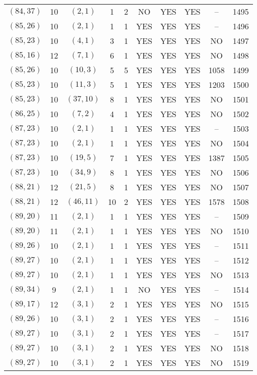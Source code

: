 \begin{longtable}{|c|c|c|c|c|c|c|c|c|c|}
$(84, 37)$ & 10 & $(2, 1)$ & 1 & 2 & NO & YES & YES & -- & 1495\\
$(85, 26)$ & 10 & $(2, 1)$ & 1 & 1 & YES & YES & YES & -- & 1496\\
$(85, 23)$ & 10 & $(4, 1)$ & 3 & 1 & YES & YES & YES & NO & 1497\\
$(85, 16)$ & 12 & $(7, 1)$ & 6 & 1 & YES & YES & YES & NO & 1498\\
$(85, 26)$ & 10 & $(10, 3)$ & 5 & 5 & YES & YES & YES & 1058 & 1499\\
$(85, 23)$ & 10 & $(11, 3)$ & 5 & 1 & YES & YES & YES & 1203 & 1500\\
$(85, 23)$ & 10 & $(37, 10)$ & 8 & 1 & YES & YES & YES & NO & 1501\\
$(86, 25)$ & 10 & $(7, 2)$ & 4 & 1 & YES & YES & YES & NO & 1502\\
$(87, 23)$ & 10 & $(2, 1)$ & 1 & 1 & YES & YES & YES & -- & 1503\\
$(87, 23)$ & 10 & $(2, 1)$ & 1 & 1 & YES & YES & YES & NO & 1504\\
$(87, 23)$ & 10 & $(19, 5)$ & 7 & 1 & YES & YES & YES & 1387 & 1505\\
$(87, 23)$ & 10 & $(34, 9)$ & 8 & 1 & YES & YES & YES & NO & 1506\\
$(88, 21)$ & 12 & $(21, 5)$ & 8 & 1 & YES & YES & YES & NO & 1507\\
$(88, 21)$ & 12 & $(46, 11)$ & 10 & 2 & YES & YES & YES & 1578 & 1508\\
$(89, 20)$ & 11 & $(2, 1)$ & 1 & 1 & YES & YES & YES & -- & 1509\\
$(89, 20)$ & 11 & $(2, 1)$ & 1 & 1 & YES & YES & YES & NO & 1510\\
$(89, 26)$ & 10 & $(2, 1)$ & 1 & 1 & YES & YES & YES & -- & 1511\\
$(89, 27)$ & 10 & $(2, 1)$ & 1 & 1 & YES & YES & YES & -- & 1512\\
$(89, 27)$ & 10 & $(2, 1)$ & 1 & 1 & YES & YES & YES & NO & 1513\\
$(89, 34)$ & 9 & $(2, 1)$ & 1 & 1 & NO & YES & YES & -- & 1514\\
$(89, 17)$ & 12 & $(3, 1)$ & 2 & 1 & YES & YES & YES & NO & 1515\\
$(89, 26)$ & 10 & $(3, 1)$ & 2 & 1 & YES & YES & YES & -- & 1516\\
$(89, 27)$ & 10 & $(3, 1)$ & 2 & 1 & YES & YES & YES & -- & 1517\\
$(89, 27)$ & 10 & $(3, 1)$ & 2 & 1 & YES & YES & YES & NO & 1518\\
$(89, 27)$ & 10 & $(3, 1)$ & 2 & 1 & YES & YES & YES & NO & 1519\\

\end{longtable}

